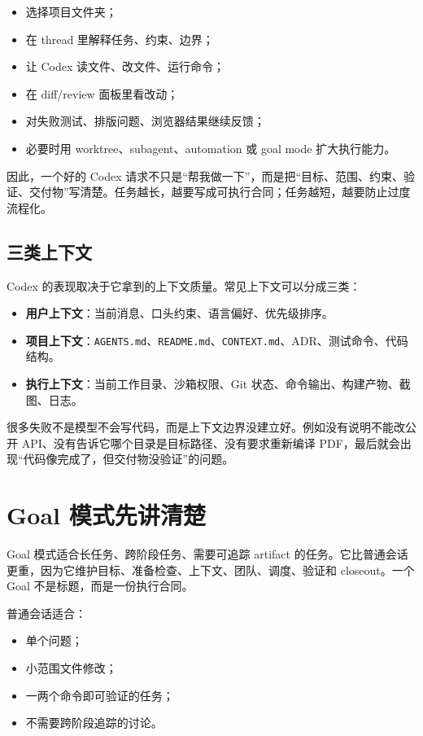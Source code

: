 \documentclass[UTF8,a4paper,11pt,fontset=none]{ctexart}
\newcommand{\file}[1]{\texttt{#1}}
\newcommand{\keypoint}[1]{\textbf{#1}}
\begin{document}
\begin{itemize}
  \item 选择项目文件夹；
  \item 在 thread 里解释任务、约束、边界；
  \item 让 Codex 读文件、改文件、运行命令；
  \item 在 diff/review 面板里看改动；
  \item 对失败测试、排版问题、浏览器结果继续反馈；
  \item 必要时用 worktree、subagent、automation 或 goal mode 扩大执行能力。
\end{itemize}

因此，一个好的 Codex 请求不只是“帮我做一下”，而是把“目标、范围、约束、验证、交付物”写清楚。任务越长，越要写成可执行合同；任务越短，越要防止过度流程化。

\subsection{三类上下文}

Codex 的表现取决于它拿到的上下文质量。常见上下文可以分成三类：

\begin{itemize}
  \item \keypoint{用户上下文}：当前消息、口头约束、语言偏好、优先级排序。
  \item \keypoint{项目上下文}：\file{AGENTS.md}、\file{README.md}、\file{CONTEXT.md}、ADR、测试命令、代码结构。
  \item \keypoint{执行上下文}：当前工作目录、沙箱权限、Git 状态、命令输出、构建产物、截图、日志。
\end{itemize}

很多失败不是模型不会写代码，而是上下文边界没建立好。例如没有说明不能改公开 API、没有告诉它哪个目录是目标路径、没有要求重新编译 PDF，最后就会出现“代码像完成了，但交付物没验证”的问题。

\section{Goal 模式先讲清楚}

Goal 模式适合长任务、跨阶段任务、需要可追踪 artifact 的任务。它比普通会话更重，因为它维护目标、准备检查、上下文、团队、调度、验证和 closeout。一个 Goal 不是标题，而是一份执行合同。

普通会话适合：

\begin{itemize}
  \item 单个问题；
  \item 小范围文件修改；
  \item 一两个命令即可验证的任务；
  \item 不需要跨阶段追踪的讨论。
\end{itemize}
\end{document}
